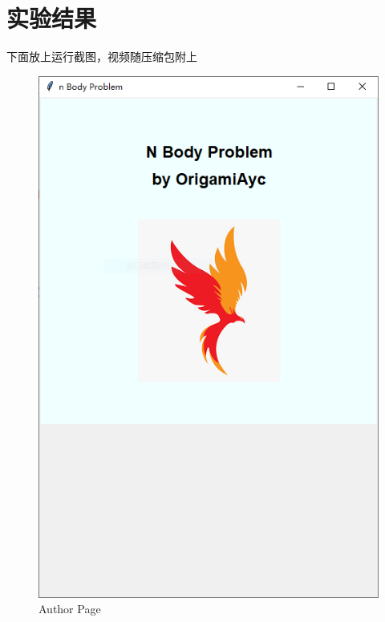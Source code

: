 \documentclass[]{report}
\begin{document}
	\chapter{实验结果}
		下面放上运行截图，视频随压缩包附上
		\begin{figure}[h]
			\centering
			\begin{minipage}{40em}
				\begin{minipage}{18em}
					\centering
					\includegraphics[scale=0.5]{pics/AuthorPage.PNG}
					\caption{Author Page}
				\end{minipage}
				\quad
				\begin{minipage}{18em}
					\centering

\end{minipage}
\end{minipage}
\end{figure}
\end{document}
